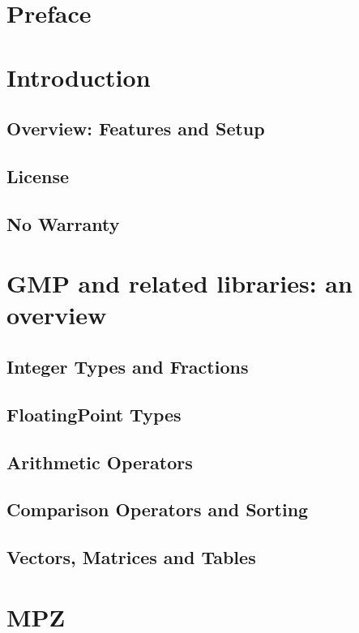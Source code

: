\documentclass[12pt,a4paper,openany]{book}
\begin{document}
\chapter{Preface}

\chapter{Introduction}

\section{Overview: Features and Setup}

\section{License}

\section{No Warranty}

\chapter{GMP and related libraries: an overview}

\section{Integer Types and Fractions}

\section{FloatingPoint Types}

\section{Arithmetic Operators}

\section{Comparison Operators and Sorting}

\section{Vectors, Matrices and Tables}

\chapter{MPZ}
\end{document}
